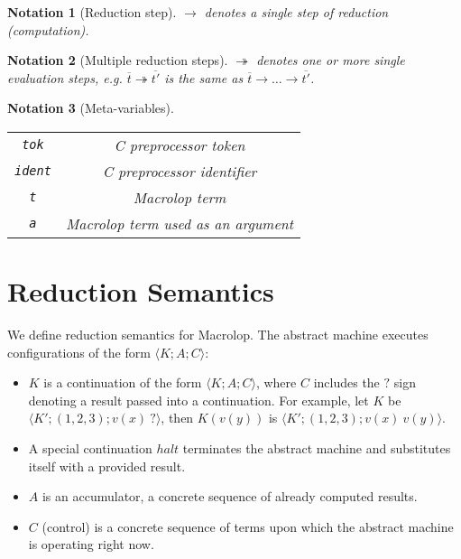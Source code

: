 \documentclass[12pt]{article}
\theoremstyle{break}
\newtheorem{notation}{Notation}
\begin{document}
\begin{notation}[Reduction step]
    $\to$ denotes a single step of reduction (computation).
\end{notation}

\begin{notation}[Multiple reduction steps]
    $\twoheadrightarrow$ denotes one or more single evaluation steps, e.g.
    $\overline{t} \twoheadrightarrow \overline{t'}$ is the same as
    $\overline{t} \to \ldots \to \overline{t'}$.
\end{notation}

\begin{notation}[Meta-variables]
    \ \\
    \begin{tabular}{|c|c|}
        \hline
        \texttt{tok} & C preprocessor token \\
        \texttt{ident} & C preprocessor identifier \\
        \texttt{t} & Macrolop term \\
        \texttt{a} & Macrolop term used as an argument \\
        \hline
    \end{tabular}
\end{notation}

\section{Reduction Semantics}

We define reduction semantics for Macrolop. The abstract machine executes configurations
of the form $\langle K; A; C \rangle$:

\begin{itemize}
    \item $K$ is a continuation of the form $\langle K; A; C \rangle$, where
    $C$ includes the $?$ sign denoting a result passed into a continuation.
    For example, let $K$ be $\langle K'; (1, 2, 3); v(x) \ ? \rangle$,
    then $K(v(y))$ is $\langle K'; (1, 2, 3); v(x) \ v(y) \rangle$.

    \item A special continuation $halt$ terminates the abstract machine and
    substitutes itself with a provided result.

    \item $A$ is an accumulator, a concrete sequence of already computed
    results.

    \item $C$ (control) is a concrete sequence of terms upon which the abstract
    machine is operating right now.
\end{itemize}
\end{document}
